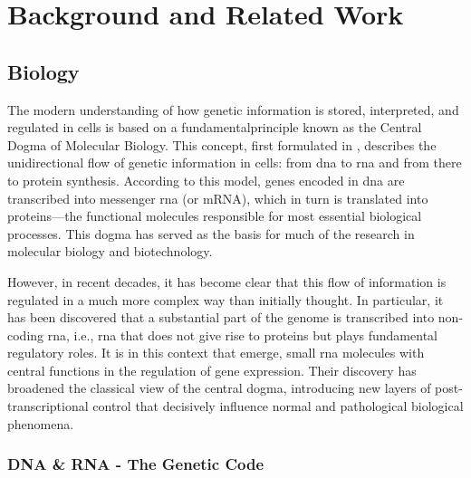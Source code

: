 
%

\chapter{Background and Related Work}
\label{cha:background_and_related_work}

\section{Biology}
\label{sec:biology}
The modern understanding of how genetic information is stored, interpreted, and
regulated in cells is based on a fundamentalprinciple known as the Central
Dogma of Molecular Biology. This concept, first formulated in 
\textcites{discovery_dna_Watson1953The, updated_disc_of_dna_Pray2008DNA}, describes
the unidirectional flow of genetic information in cells: from \gls{dna} to
\gls{rna} and from there
to protein synthesis. According to this model, genes encoded in \gls{dna} are
transcribed into messenger \gls{rna} (or mRNA), which in turn is
translated into proteins—the functional molecules responsible for most
essential biological processes. This dogma has served as
the basis for much of the research in molecular biology and biotechnology.

However, in recent decades, it has become clear that this flow of information
is regulated in a much more complex way than initially thought. In particular,
it has been discovered that a substantial part of the genome is transcribed
into non-coding \gls{rna}, i.e., \gls{rna} that does not give rise to
proteins but plays fundamental regulatory roles. It is in this context that
 emerge, small \gls{rna} molecules with central
functions in the regulation of gene expression. Their discovery has broadened
the classical view of the central dogma, introducing new layers of
post-transcriptional control that decisively influence normal and pathological
biological phenomena.

\subsection*{DNA \& RNA - The Genetic Code}

